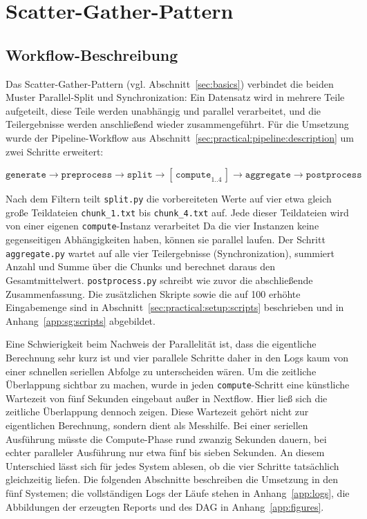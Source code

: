 \section{Scatter-Gather-Pattern}
\label{sec:practical:scattergather}

\subsection{Workflow-Beschreibung}
\label{sec:practical:scattergather:description}

Das Scatter-Gather-Pattern (vgl. Abschnitt~\ref{sec:basics}) verbindet die beiden Muster
Parallel-Split und Synchronization: Ein Datensatz wird in mehrere Teile aufgeteilt, diese Teile
werden unabhängig und parallel verarbeitet, und die Teilergebnisse werden anschließend wieder
zusammengeführt. Für die Umsetzung wurde der Pipeline-Workflow aus
Abschnitt~\ref{sec:practical:pipeline:description} um zwei Schritte erweitert:

\[
  \texttt{generate} \rightarrow \texttt{preprocess} \rightarrow \texttt{split}
  \rightarrow [\,\texttt{compute}_{1..4}\,] \rightarrow
  \texttt{aggregate} \rightarrow \texttt{postprocess}
\]

Nach dem Filtern teilt \texttt{split.py} die vorbereiteten Werte auf vier etwa gleich große
Teildateien \texttt{chunk\_1.txt} bis \texttt{chunk\_4.txt} auf. Jede dieser Teildateien wird von
einer eigenen \texttt{compute}-Instanz verarbeitet Da die vier Instanzen keine gegenseitigen
Abhängigkeiten haben, können sie parallel laufen. Der Schritt \texttt{aggregate.py} wartet auf alle
vier Teilergebnisse (Synchronization), summiert Anzahl und Summe über die Chunks und berechnet
daraus den Gesamtmittelwert. \texttt{postprocess.py} schreibt wie zuvor die abschließende
Zusammenfassung. Die zusätzlichen Skripte sowie die auf 100 erhöhte Eingabemenge sind in
Abschnitt~\ref{sec:practical:setup:scripts} beschrieben und in Anhang~\ref{app:sg:scripts}
abgebildet.

Eine Schwierigkeit beim Nachweis der Parallelität ist, dass die eigentliche Berechnung sehr kurz
ist und vier parallele Schritte daher in den Logs kaum von einer schnellen seriellen Abfolge zu
unterscheiden wären. Um die zeitliche Überlappung sichtbar zu machen, wurde in jeden
\texttt{compute}-Schritt eine künstliche Wartezeit von fünf Sekunden eingebaut außer in Nextflow. Hier ließ sich die zeitliche Überlappung dennoch zeigen. Diese Wartezeit
gehört nicht zur eigentlichen Berechnung, sondern dient als Messhilfe. Bei einer seriellen
Ausführung müsste die Compute-Phase rund zwanzig Sekunden dauern, bei echter paralleler Ausführung
nur etwa fünf bis sieben Sekunden. An diesem Unterschied lässt sich für jedes System ablesen, ob
die vier Schritte tatsächlich gleichzeitig liefen. Die folgenden Abschnitte beschreiben die
Umsetzung in den fünf Systemen; die vollständigen Logs der Läufe stehen in Anhang~\ref{app:logs},
die Abbildungen der erzeugten Reports und des DAG in Anhang~\ref{app:figures}.

